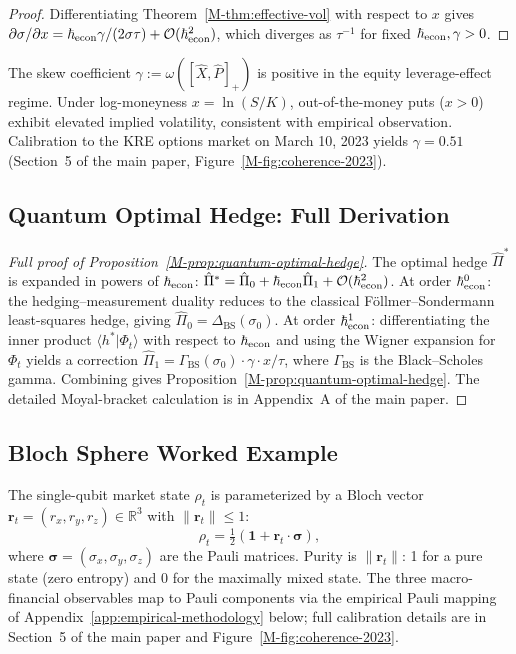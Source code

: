 \begin{proof}
Differentiating Theorem~\ref{M-thm:effective-vol} with respect to $x$ gives
$\partial \sigma / \partial x = \hbar_{\mathrm{econ}} \gamma / (2\sigma \tau) + \mathcal{O}(\hbar_{\mathrm{econ}}^2)$,
which diverges as $\tau^{-1}$ for fixed $\hbar_{\mathrm{econ}}, \gamma > 0$.
\end{proof}

The skew coefficient $\gamma := \omega([\hat{X}, \hat{P}]_+)$ is positive in the
equity leverage-effect regime. Under log-moneyness $x = \ln(S/K)$, out-of-the-money
puts ($x > 0$) exhibit elevated implied volatility, consistent with empirical
observation. Calibration to the KRE options market on March 10, 2023 yields
$\gamma = 0.51$ (Section~5 of the main paper, Figure~\ref{M-fig:coherence-2023}).

\subsection{Quantum Optimal Hedge: Full Derivation}
\label{sec:S1-hedge}

\begin{proof}[Full proof of Proposition~\ref{M-prop:quantum-optimal-hedge}]
The optimal hedge $\hat{\Pi}^*$ is expanded in powers of $\hbar_{\mathrm{econ}}$:
$\hat{\Pi}^* = \hat{\Pi}_0 + \hbar_{\mathrm{econ}} \hat{\Pi}_1 + \mathcal{O}(\hbar_{\mathrm{econ}}^2)$.
At order $\hbar_{\mathrm{econ}}^0$: the hedging--measurement duality reduces to the classical
Föllmer--Sondermann least-squares hedge, giving $\hat{\Pi}_0 = \Delta_{\mathrm{BS}}(\sigma_0)$.
At order $\hbar_{\mathrm{econ}}^1$: differentiating the inner product
$\langle h^* | \Phi_t \rangle$ with respect to $\hbar_{\mathrm{econ}}$ and using the Wigner expansion
for $\Phi_t$ yields a correction
$\hat{\Pi}_1 = \Gamma_{\mathrm{BS}}(\sigma_0) \cdot \gamma \cdot x / \tau$,
where $\Gamma_{\mathrm{BS}}$ is the Black--Scholes gamma. Combining gives
Proposition~\ref{M-prop:quantum-optimal-hedge}.
The detailed Moyal-bracket calculation is in Appendix~A of the main paper.
\end{proof}

\subsection{Bloch Sphere Worked Example}
\label{sec:S1-bloch}

The single-qubit market state $\rho_t$ is parameterized by a Bloch vector
$\mathbf{r}_t = (r_x, r_y, r_z) \in \mathbb{R}^3$ with $\|\mathbf{r}_t\| \leq 1$:
\begin{equation*}
    \rho_t = \tfrac{1}{2}(\mathbf{1} + \mathbf{r}_t \cdot \boldsymbol{\sigma}),
\end{equation*}
where $\boldsymbol{\sigma} = (\sigma_x, \sigma_y, \sigma_z)$ are the Pauli matrices.
Purity is $\|\mathbf{r}_t\|$: 1 for a pure state (zero entropy) and 0 for the
maximally mixed state. The three macro-financial observables map to Pauli components
via the empirical Pauli mapping of Appendix~\ref{app:empirical-methodology} below; full calibration
details are in Section~5 of the main paper and Figure~\ref{M-fig:coherence-2023}.

